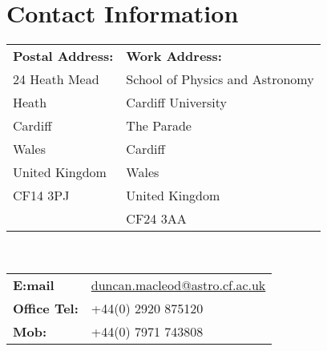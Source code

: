 \section{Contact Information}
\begin{tabular}{@{}p{50mm} p{50mm}}
\textbf{Postal Address:} & \textbf{Work Address:} \\
24 Heath Mead & School of Physics and Astronomy\\
Heath & Cardiff University\\
Cardiff & The Parade\\
Wales & Cardiff \\
United Kingdom & Wales\\
CF14 3PJ & United Kingdom\\
& CF24 3AA
\end{tabular}\\
\begin{tabular}{@{}ll}
\textbf{E:mail} & \href{mailto:duncan.macleod@astro.cf.ac.uk}{duncan.macleod@astro.cf.ac.uk}\\
\textbf{Office Tel:} & +44(0) 2920 875120\\
\textbf{Mob:} & +44(0) 7971 743808
\end{tabular}
